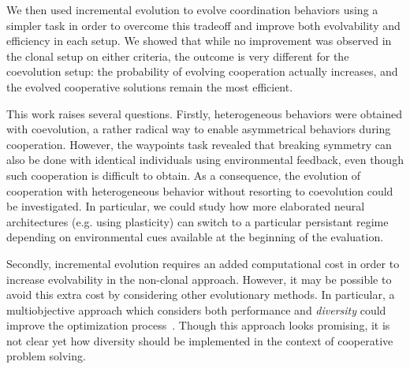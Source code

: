   We then used incremental evolution to evolve coordination behaviors using a simpler task in order to overcome this tradeoff and improve both evolvability and efficiency in each setup. We showed that while no improvement was observed in the clonal setup on either criteria, the outcome is very different for the coevolution setup: the probability of evolving cooperation actually increases, and the evolved cooperative solutions remain the most efficient.
 
  This work raises several questions. Firstly, heterogeneous behaviors were obtained with coevolution, a rather radical way to enable asymmetrical behaviors during cooperation. However, the waypoints task revealed that breaking symmetry can also be done with identical individuals using environmental feedback, even though such cooperation is difficult to obtain. As a consequence,  the evolution of cooperation with heterogeneous behavior without resorting to coevolution could be investigated. In particular, we could study how more elaborated neural architectures (e.g. using plasticity) can switch to a particular persistant regime depending on environmental cues available at the beginning of the evaluation.

  Secondly, incremental evolution requires an added computational cost in order to increase evolvability in the non-clonal approach. However, it may be possible to avoid this extra cost by considering other evolutionary methods. In particular, a multiobjective approach which considers both performance and \emph{diversity} could improve the optimization process~\parencite{Lehman2008, Doncieux2014}. Though this approach looks promising, it is not clear yet how diversity should be implemented in the context of cooperative problem solving.